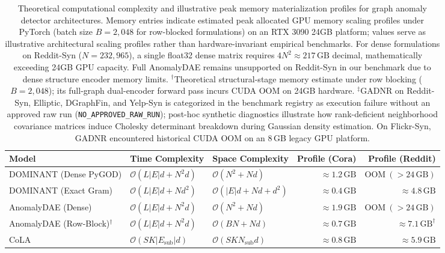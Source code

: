 \documentclass[applsci,article,submit,moreauthors,pdftex]{Definitions/mdpi}
\begin{document}
\begin{table}[htbp]
\centering\footnotesize\setlength{\tabcolsep}{3pt}
\caption{Theoretical computational complexity and illustrative peak memory materialization profiles for graph anomaly detector architectures. Memory entries indicate estimated peak allocated GPU memory scaling profiles under PyTorch (batch size $B=2{,}048$ for row-blocked formulations) on an RTX 3090 24GB platform; values serve as illustrative architectural scaling profiles rather than hardware-invariant empirical benchmarks. For dense formulations on Reddit-Syn ($N=232,965$), a single float32 dense matrix requires $4 N^2 \approx 217\,\mathrm{GB}$ decimal, mathematically exceeding 24GB GPU capacity. Full AnomalyDAE remains unsupported on Reddit-Syn in our benchmark due to dense structure encoder memory limits. $^\dagger$Theoretical structural-stage memory estimate under row blocking ($B=2{,}048$); its full-graph dual-encoder forward pass incurs CUDA OOM on 24GB hardware. $^\ddagger$GADNR on Reddit-Syn, Elliptic, DGraphFin, and Yelp-Syn is categorized in the benchmark registry as execution failure without an approved raw run (\texttt{NO\_APPROVED\_RAW\_RUN}); post-hoc synthetic diagnostics illustrate how rank-deficient neighborhood covariance matrices induce Cholesky determinant breakdown during Gaussian density estimation. On Flickr-Syn, GADNR encountered historical CUDA OOM on an 8\,GB legacy GPU platform.}
\label{tab:complexity_comparison}
\begin{tabularx}{\textwidth}{lXXrr}\toprule
\textbf{Model} & \textbf{Time Complexity} & \textbf{Space Complexity} & \textbf{Profile (Cora)} & \textbf{Profile (Reddit)} \\\midrule
DOMINANT (Dense PyGOD) & $\mathcal{O}(L |E| d + N^2 d)$ & $\mathcal{O}(N^2 + N d)$ & $\approx 1.2\,\mathrm{GB}$ & $\mathrm{OOM}\ (>24\,\mathrm{GB})$ \\
DOMINANT (Exact Gram) & $\mathcal{O}(L |E| d + N d^2)$ & $\mathcal{O}(|E| d + N d + d^2)$ & $\approx 0.4\,\mathrm{GB}$ & $\approx 4.8\,\mathrm{GB}$ \\
AnomalyDAE (Dense) & $\mathcal{O}(L |E| d + N^2 d)$ & $\mathcal{O}(N^2 + N d)$ & $\approx 1.9\,\mathrm{GB}$ & $\mathrm{OOM}\ (>24\,\mathrm{GB})$ \\
AnomalyDAE (Row-Block)$^\dagger$ & $\mathcal{O}(L |E| d + N^2 d)$ & $\mathcal{O}(B N + N d)$ & $\approx 0.7\,\mathrm{GB}$ & $\approx 7.1\,\mathrm{GB}^\dagger$ \\
CoLA & $\mathcal{O}(S K |E_{\mathrm{sub}}| d)$ & $\mathcal{O}(S K N_{\mathrm{sub}} d)$ & $\approx 0.8\,\mathrm{GB}$ & $\approx 5.9\,\mathrm{GB}$ \\

\end{tabularx}
\end{table}
\end{document}
